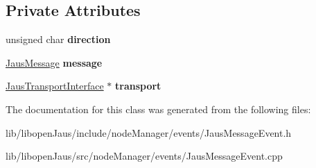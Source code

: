 \subsection*{\-Private \-Attributes}
\begin{DoxyCompactItemize}
\item 
\hypertarget{class_jaus_message_event_ac9a330bcfb545f2144ba0561103c1cdb}{unsigned char {\bfseries direction}}\label{class_jaus_message_event_ac9a330bcfb545f2144ba0561103c1cdb}

\item 
\hypertarget{class_jaus_message_event_aaa92899112765572c7491caf7eadd307}{\hyperlink{struct_jaus_message_struct}{\-Jaus\-Message} {\bfseries message}}\label{class_jaus_message_event_aaa92899112765572c7491caf7eadd307}

\item 
\hypertarget{class_jaus_message_event_aa389343bf934b7379802787a1f9c233f}{\hyperlink{class_jaus_transport_interface}{\-Jaus\-Transport\-Interface} $\ast$ {\bfseries transport}}\label{class_jaus_message_event_aa389343bf934b7379802787a1f9c233f}

\end{DoxyCompactItemize}


\-The documentation for this class was generated from the following files\-:\begin{DoxyCompactItemize}
\item 
lib/libopen\-Jaus/include/node\-Manager/events/\-Jaus\-Message\-Event.\-h\item 
lib/libopen\-Jaus/src/node\-Manager/events/\-Jaus\-Message\-Event.\-cpp\end{DoxyCompactItemize}
